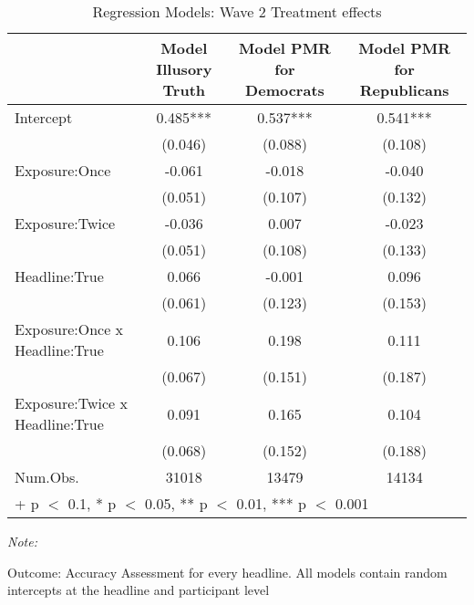 \begin{table}

\caption{Regression Models: Wave 2 Treatment effects}
\centering
\begin{threeparttable}
\begin{tabular}[t]{lccc}
\toprule
  & Model Illusory Truth & Model PMR for Democrats & Model PMR for Republicans\\
\midrule
Intercept & 0.485*** & 0.537*** & 0.541***\\
 & (0.046) & (0.088) & (0.108)\\
Exposure:Once & -0.061 & -0.018 & -0.040\\
 & (0.051) & (0.107) & (0.132)\\
Exposure:Twice & -0.036 & 0.007 & -0.023\\
 & (0.051) & (0.108) & (0.133)\\
Headline:True & 0.066 & -0.001 & 0.096\\
 & (0.061) & (0.123) & (0.153)\\
Exposure:Once x Headline:True & 0.106 & 0.198 & 0.111\\
 & (0.067) & (0.151) & (0.187)\\
Exposure:Twice x Headline:True & 0.091 & 0.165 & 0.104\\
 & (0.068) & (0.152) & (0.188)\\
\midrule
Num.Obs. & 31018 & 13479 & 14134\\
\bottomrule
\multicolumn{4}{l}{\rule{0pt}{1em}+ p $<$ 0.1, * p $<$ 0.05, ** p $<$ 0.01, *** p $<$ 0.001}\\
\end{tabular}
\begin{tablenotes}
\item \textit{Note: } 
\item Outcome: Accuracy Assessment for every headline. All models contain random intercepts at the headline and participant level
\end{tablenotes}
\end{threeparttable}
\end{table}
